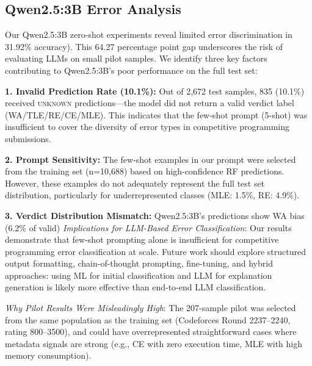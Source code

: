 \documentclass[acmsmall]{acmart}
\begin{document}
\subsection{Qwen2.5:3B Error Analysis}

Our Qwen2.5:3B zero-shot experiments reveal limited error discrimination in
31.92\% accuracy). This 64.27 percentage point gap underscores the risk of
evaluating LLMs on small pilot samples. We identify three key factors
contributing to Qwen2.5:3B's poor performance on the full test set:

\textbf{1. Invalid Prediction Rate (10.1\%):} Out of 2,672 test samples, 835
(10.1\%) received \textsc{unknown} predictions---the model did not return a
valid verdict label (WA/TLE/RE/CE/MLE). This indicates that the few-shot
prompt (5-shot) was insufficient to cover the diversity of error types in
competitive programming submissions.

\textbf{2. Prompt Sensitivity:} The few-shot examples in our prompt were
selected from the training set (n=10,688) based on high-confidence RF
predictions. However, these examples do not adequately represent the full test
set distribution, particularly for underrepresented classes (MLE: 1.5\%,
RE: 4.9\%).

\textbf{3. Verdict Distribution Mismatch:} Qwen2.5:3B's predictions show WA bias (6.2\% of valid)
\textit{Implications for LLM-Based Error Classification}: Our results
demonstrate that few-shot prompting alone is insufficient for competitive
programming error classification at scale. Future work should explore
structured output formatting, chain-of-thought prompting, fine-tuning,
and hybrid approaches: using ML for initial classification and LLM for
explanation generation is likely more effective than end-to-end LLM
classification.

\textit{Why Pilot Results Were Misleadingly High}: The 207-sample pilot was
selected from the same population as the training set (Codeforces Round
2237--2240, rating 800--3500), and could have overrepresented straightforward
cases where metadata signals are strong (e.g., CE with zero execution time,
MLE with high memory consumption).

\begin{table}[htbp]
\centering
\caption{Qwen2.5:3B prediction analysis on full test set (n=2,672)}
\label{tab:deepseek-analysis}
%
\end{table}
\end{document}
